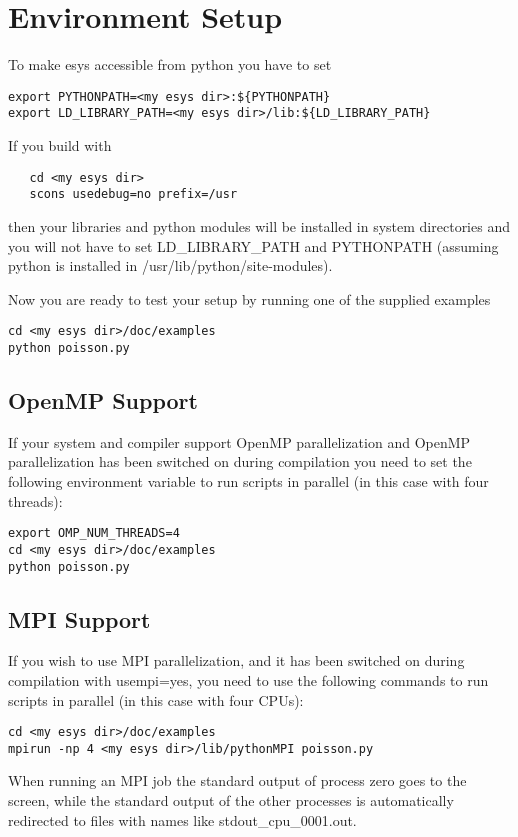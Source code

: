 \section{Environment Setup}
To make esys accessible from python you have to set
\begin{verbatim}
export PYTHONPATH=<my esys dir>:${PYTHONPATH}
export LD_LIBRARY_PATH=<my esys dir>/lib:${LD_LIBRARY_PATH}
\end{verbatim}

If you build \esys with
\begin{verbatim}
   cd <my esys dir>
   scons usedebug=no prefix=/usr
\end{verbatim}
then your libraries and python modules will be installed in system directories and you will
not have to set LD_LIBRARY_PATH and PYTHONPATH (assuming python is installed in
/usr/lib/python/site-modules).

Now you are ready to test your setup by running one of the supplied examples
\begin{verbatim}
cd <my esys dir>/doc/examples
python poisson.py
\end{verbatim}

\subsection{OpenMP Support}

If your system and compiler support OpenMP parallelization and OpenMP parallelization has been switched on during compilation you need to set the following environment variable to run scripts in parallel (in this case with four threads):
\begin{verbatim}
export OMP_NUM_THREADS=4
cd <my esys dir>/doc/examples
python poisson.py
\end{verbatim}

\subsection{MPI Support}

If you wish to use MPI parallelization, and it has been switched on during compilation with usempi=yes, you need to use the following commands to run scripts in parallel (in this case with four CPUs):
\begin{verbatim}
cd <my esys dir>/doc/examples
mpirun -np 4 <my esys dir>/lib/pythonMPI poisson.py
\end{verbatim}

When running an MPI job the standard output of process zero goes to the screen, while the standard output of the other processes
is automatically redirected to files with names like stdout_cpu_0001.out.

